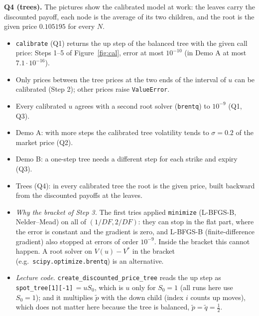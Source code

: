 \documentclass[11pt,a4paper]{article}
\newcommand{\ansbox}[1]{\begin{ansboxenv}#1\end{ansboxenv}}
\newcommand{\subhead}[1]{\par\medskip\noindent{\large\bfseries #1}\par\smallskip\noindent\ignorespaces}
\begin{document}
\ansbox{\textbf{Q4 (trees).} The pictures show the calibrated model at work: the leaves carry the discounted payoff, each node is the average of its two children, and the root is the given price $0.105195$ for every $N$.}

\subhead{Conclusions.}
\ansbox{\begin{itemize}
\item \texttt{calibrate} (Q1) returns the up step of the balanced tree with the given call price: Steps 1--5 of Figure~\ref{fig:cal}, error at most $10^{-10}$ (in Demo A at most $7.1\cdot10^{-16}$).
\item Only prices between the tree prices at the two ends of the interval of $u$ can be calibrated (Step 2); other prices raise \texttt{ValueError}.
\item Every calibrated $u$ agrees with a second root solver (\texttt{brentq}) to $10^{-9}$ (Q1, Q3).
\item Demo A: with more steps the calibrated tree volatility tends to $\sigma=0.2$ of the market price (Q2).
\item Demo B: a one-step tree needs a different step for each strike and expiry (Q3).
\item Trees (Q4): in every calibrated tree the root is the given price, built backward from the discounted payoffs at the leaves.
\end{itemize}}

\subhead{Comment (to keep in mind).}
\begin{itemize}
\item \emph{Why the bracket of Step 3.} The first tries applied \texttt{minimize} (L-BFGS-B, Nelder--Mead) on all of $(1/DF,2/DF)$: they can stop in the flat part, where the error is constant and the gradient is zero, and L-BFGS-B (finite-difference gradient) also stopped at errors of order $10^{-9}$. Inside the bracket this cannot happen. A root solver on $V(u)-V^*$ in the bracket (e.g.\ \texttt{scipy.optimize.brentq}) is an alternative.
\item \emph{Lecture code.} \texttt{create\_discounted\_price\_tree} reads the up step as \texttt{spot\_tree[1][-1]}$\,=uS_0$, which is $u$ only for $S_0=1$ (all runs here use $S_0=1$); and it multiplies $\tilde p$ with the down child (index $i$ counts up moves), which does not matter here because the tree is balanced, $\tilde p=\tilde q=\frac12$.
\end{itemize}
\end{document}
